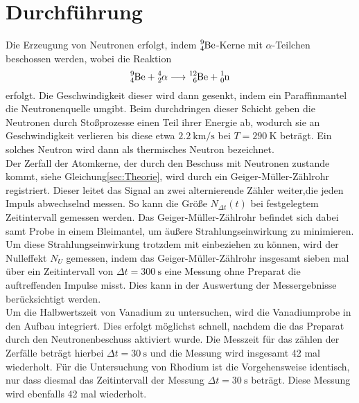 \section{Durchführung}
\label{sec:Durchführung}

Die Erzeugung von Neutronen erfolgt, indem $\ce{^{9}_{4}Be}$-Kerne mit $\alpha$-Teilchen beschossen werden, 
wobei die Reaktion 
\begin{equation}
    \ce{^{9}_{4}Be} + \ce{^{4}_{2}\alpha} \longrightarrow \ce{^{12}_{6}Be} + \ce{^{1}_{0}n}
\end{equation}
erfolgt. Die Geschwindigkeit dieser wird dann gesenkt, indem ein Paraffinmantel die Neutronenquelle umgibt. Beim durchdringen 
dieser Schicht geben die Neutronen durch Stoßprozesse einen Teil ihrer Energie ab, wodurch sie an Geschwindigkeit verlieren bis 
diese etwa $\SI{2.2}{\kilo\metre\per\s} $ bei $T=\SI{290}{\kelvin} $ beträgt. Ein solches Neutron wird dann als thermisches 
Neutron bezeichnet. 
\\
Der Zerfall der Atomkerne, der durch den Beschuss mit Neutronen zustande kommt, siehe Gleichung\ref{sec:Theorie}, wird durch ein 
Geiger-Müller-Zählrohr registriert. Dieser leitet das Signal an zwei alternierende Zähler weiter,die jeden Impuls abwechselnd messen.
So kann die Größe $N_{\Delta t}(t) $ bei festgelegtem Zeitintervall gemessen werden. Das Geiger-Müller-Zählrohr befindet sich dabei 
samt Probe in einem Bleimantel, um äußere Strahlungseinwirkung zu minimieren. Um diese Strahlungseinwirkung trotzdem mit 
einbeziehen zu können, wird der Nulleffekt $N_U$ gemessen, indem das Geiger-Müller-Zählrohr insgesamt sieben mal über ein 
Zeitintervall von $\Delta t =\SI{300}{\s} $ eine Messung ohne Preparat die auftreffenden Impulse misst. Dies kann in der Auswertung der Messergebnisse 
berücksichtigt werden.
\\
Um die Halbwertszeit von Vanadium zu untersuchen, wird die Vanadiumprobe in den Aufbau integriert. Dies erfolgt möglichst schnell,
nachdem die das Preparat durch den Neutronenbeschuss aktiviert wurde. Die Messzeit für das zählen der Zerfälle beträgt hierbei 
$\Delta t= \SI{30}{\s} $ und die Messung wird insgesamt 42 mal wiederholt. Für die Untersuchung von Rhodium ist die 
Vorgehensweise identisch, nur dass diesmal das Zeitintervall der Messung $\Delta t= \SI{30}{\s} $ beträgt. Diese Messung wird 
ebenfalls 42 mal wiederholt. 
